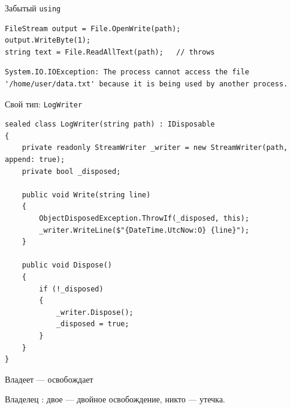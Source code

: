 \documentclass[aspectratio=169,10pt,t]{beamer}
\newcommand{\codesm}{\ttfamily\fontsize{7.6}{9.0}\selectfont}
\begin{document}
\begin{frame}[fragile]{Забытый \texttt{using}}
  \slidetop

\begin{lstlisting}[style=csharp,basicstyle=\codesm]
FileStream output = File.OpenWrite(path);
output.WriteByte(1);
string text = File.ReadAllText(path);   // throws
\end{lstlisting}

  \slidegap
\begin{lstlisting}[style=term,basicstyle=\ttfamily\fontsize{6.6}{8}\selectfont]
System.IO.IOException: The process cannot access the file
'/home/user/data.txt' because it is being used by another process.
\end{lstlisting}

  \slidegap
\end{frame}

\begin{frame}[fragile]{Свой тип: \texttt{LogWriter}}
  \vspace{0.3em}
\begin{lstlisting}[style=csharp,basicstyle=\ttfamily\fontsize{6.6}{7.6}\selectfont]
sealed class LogWriter(string path) : IDisposable
{
    private readonly StreamWriter _writer = new StreamWriter(path, append: true);
    private bool _disposed;

    public void Write(string line)
    {
        ObjectDisposedException.ThrowIf(_disposed, this);
        _writer.WriteLine($"{DateTime.UtcNow:O} {line}");
    }

    public void Dispose()
    {
        if (!_disposed)
        {
            _writer.Dispose();
            _disposed = true;
        }
    }
}
\end{lstlisting}

  \vspace{-0.2em}
\end{frame}

\begin{frame}{Владеет --- освобождает}
  \slidetop

  \slidegap
  {\large Владелец : двое --- двойное освобождение, никто --- утечка.}
\end{frame}
\end{document}
